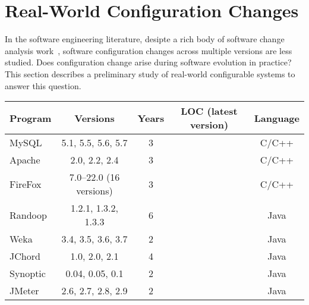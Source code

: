 \section{Real-World Configuration Changes}
\label{sec:study}

In the software engineering literature, desipte a rich body of
software change analysis work~\cite{STVR:STVR1475, Dagenais:2008, Tao:2012:SEU}, 
software configuration changes across multiple
versions are less studied. Does configuration
change arise during software evolution in practice?
This section describes a preliminary study of
\studysubjnum  real-world configurable systems to answer
this question.



\begin{table}[t]
\vspace{1mm}
\centering
\small{
\setlength{\tabcolsep}{.40\tabcolsep}
\begin{tabular}{|l||c|c|c|c|}
\hline
 Program & Versions & Years & LOC (latest version)  & Language\\
 \hline
 \hline
 MySQL & 5.1, 5.5, 5.6, 5.7 & 3 && C/C++\\
 Apache& 2.0, 2.2, 2.4 & 3  & &C/C++\\
 FireFox& 7.0--22.0 (16 versions) & 3  & &C/C++\\
 Randoop & 1.2.1, 1.3.2, 1.3.3 & 6 &    &Java\\
 Weka & 3.4, 3.5, 3.6, 3.7  & 2  &  &Java\\
 JChord & 1.0, 2.0, 2.1 &  4 &   &Java\\
 Synoptic & 0.04, 0.05, 0.1 & 2   & &Java\\
 JMeter & 2.6, 2.7, 2.8, 2.9& 2   & &Java\\
\hline
\end{tabular}
}
\vspace{-2mm}
\end{table}


